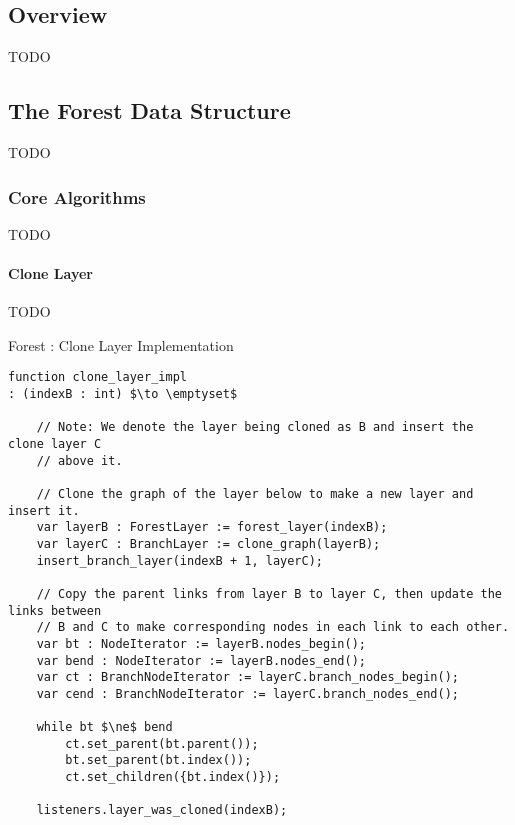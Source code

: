 \subsection{Overview}

TODO


\subsection{The Forest Data Structure}

TODO

\subsubsection{Core Algorithms}

TODO

\paragraph{Clone Layer}

TODO

\begin{stulisting}[p]
\caption{Forest : Clone Layer Implementation}
\label{code:ipfs-forest-clonelayerimpl}
\begin{lstlisting}[style=Default]
function clone_layer_impl
: (indexB : int) $\to \emptyset$

	// Note: We denote the layer being cloned as B and insert the clone layer C
	// above it.

	// Clone the graph of the layer below to make a new layer and insert it.
	var layerB : ForestLayer := forest_layer(indexB);
	var layerC : BranchLayer := clone_graph(layerB);
	insert_branch_layer(indexB + 1, layerC);

	// Copy the parent links from layer B to layer C, then update the links between
	// B and C to make corresponding nodes in each link to each other.
	var bt : NodeIterator := layerB.nodes_begin();
	var bend : NodeIterator := layerB.nodes_end();
	var ct : BranchNodeIterator := layerC.branch_nodes_begin();
	var cend : BranchNodeIterator := layerC.branch_nodes_end();

	while bt $\ne$ bend
		ct.set_parent(bt.parent());
		bt.set_parent(bt.index());
		ct.set_children({bt.index()});

	listeners.layer_was_cloned(indexB);
\end{lstlisting}
\end{stulisting}

